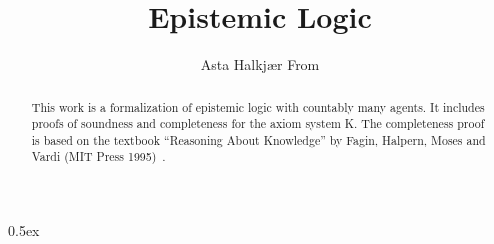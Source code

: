 \documentclass[11pt,a4paper]{article}
\begin{document}
\title{Epistemic Logic}
\author{Asta Halkjær From}
\maketitle

\begin{abstract}
  This work is a formalization of epistemic logic with countably many agents.
  It includes proofs of soundness and completeness for the axiom system K.
  The completeness proof is based on the textbook ``Reasoning About Knowledge''
  by Fagin, Halpern, Moses and Vardi (MIT Press 1995)~\cite{fagin1995}.
\end{abstract}

\tableofcontents
\newpage

\parindent 0pt\parskip 0.5ex





\end{document}
